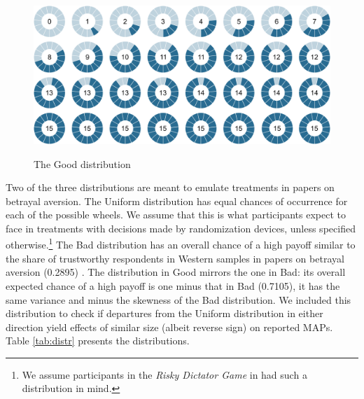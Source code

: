 \begin{figure}[h!]
  \centering
 {\includegraphics[width=\linewidth]{Left_15.pdf}}
  \caption{The Good distribution}
  \label{fig:TheGood}
\end{figure}

Two of the three distributions are meant to emulate treatments in papers on betrayal aversion.
The Uniform distribution has equal chances of occurrence for each of the possible wheels.
We assume that this is what participants expect to face in treatments with decisions made by randomization devices, unless specified otherwise.\footnote{
We assume participants in the \textit{Risky Dictator Game} in \cite{Bohnet2004} had such a distribution in mind.
}
The Bad distribution has an overall chance of a high payoff similar to the share of trustworthy respondents in Western samples in papers on betrayal aversion (0.2895) \citep[e.g. ][]{Bohnet2004,Bohnet2008}.
The distribution in Good mirrors the one in Bad: its overall expected chance of a high payoff is one minus that in Bad (0.7105), it has the same variance and minus the skewness of the Bad distribution.
We included this distribution to check if departures from the Uniform distribution in either direction yield effects of similar size (albeit reverse sign) on reported MAPs.
Table \ref{tab:distr} presents the distributions.


